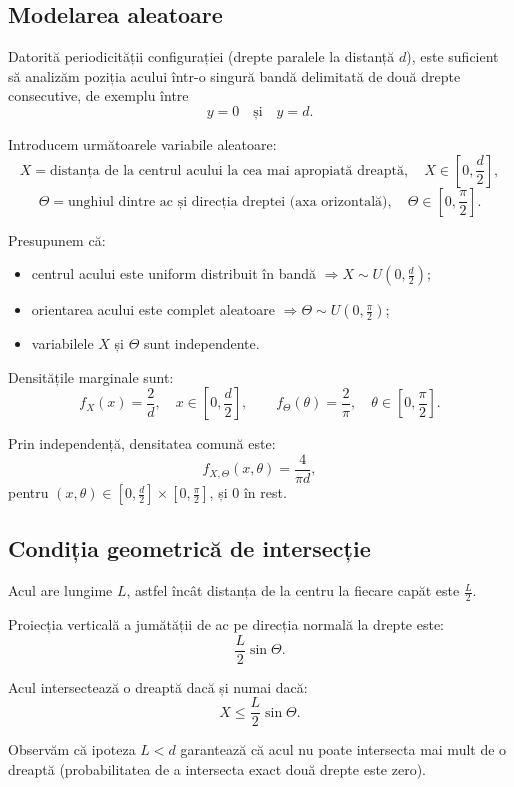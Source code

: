 \documentclass[12pt]{article}
\begin{document}
\subsection{Modelarea aleatoare}

Datorită periodicității configurației (drepte paralele la distanță $d$), este suficient să analizăm poziția acului într-o singură bandă delimitată de două drepte consecutive, de exemplu între
\[
y=0 \quad \text{și} \quad y=d.
\]

Introducem următoarele variabile aleatoare:
\[
X = \text{distanța de la centrul acului la cea mai apropiată dreaptă}, 
\quad X \in \left[0,\frac{d}{2}\right],
\]
\[
\Theta = \text{unghiul dintre ac și direcția dreptei (axa orizontală)}, 
\quad \Theta \in \left[0,\frac{\pi}{2}\right].
\]

Presupunem că:
\begin{itemize}
  \item centrul acului este uniform distribuit în bandă $\Rightarrow X \sim U\!\left(0,\frac{d}{2}\right)$;
  \item orientarea acului este complet aleatoare $\Rightarrow \Theta \sim U\!\left(0,\frac{\pi}{2}\right)$;
  \item variabilele $X$ și $\Theta$ sunt independente.
\end{itemize}

Densitățile marginale sunt:
\[
f_X(x) = \frac{2}{d}, \quad x \in \left[0,\frac{d}{2}\right],
\qquad
f_\Theta(\theta) = \frac{2}{\pi}, \quad \theta \in \left[0,\frac{\pi}{2}\right].
\]

Prin independență, densitatea comună este:
\[
f_{X,\Theta}(x,\theta) = \frac{4}{\pi d},
\]
pentru $(x,\theta)\in\left[0,\frac{d}{2}\right]\times\left[0,\frac{\pi}{2}\right]$, și $0$ în rest.

\subsection{Condiția geometrică de intersecție}

Acul are lungime $L$, astfel încât distanța de la centru la fiecare capăt este $\frac{L}{2}$.

Proiecția verticală a jumătății de ac pe direcția normală la drepte este:
\[
\frac{L}{2}\sin\Theta.
\]

Acul intersectează o dreaptă dacă și numai dacă:
\[
X \le \frac{L}{2}\sin\Theta.
\]

Observăm că ipoteza $L<d$ garantează că acul nu poate intersecta mai mult de o dreaptă (probabilitatea de a intersecta exact două drepte este zero).
\end{document}
